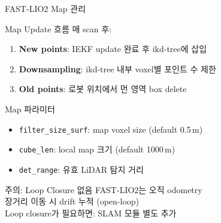 \begin{frame}{FAST-LIO2 Map 관리}
  \begin{block}{Map Update 흐름}
    매 scan 후:
    \begin{enumerate}
      \item \textbf{New points}: IEKF update 완료 후 ikd-tree에 삽입
      \item \textbf{Downsampling}: ikd-tree 내부 voxel별 포인트 수 제한
      \item \textbf{Old points}: 로봇 위치에서 먼 영역 box delete
    \end{enumerate}
  \end{block}
  \pause
  \begin{block}{Map 파라미터}
    \begin{itemize}
      \item \texttt{filter\_size\_surf}: map voxel size (default 0.5\,m)
      \item \texttt{cube\_len}: local map 크기 (default 1000\,m)
      \item \texttt{det\_range}: 유효 LiDAR 탐지 거리
    \end{itemize}
  \end{block}
  \pause
  \begin{alertblock}{주의: Loop Closure 없음}
    FAST-LIO2는 오직 odometry\\
    장거리 이동 시 drift 누적 (open-loop)\\
    Loop closure가 필요하면: SLAM 모듈 별도 추가
  \end{alertblock}
\end{frame}

